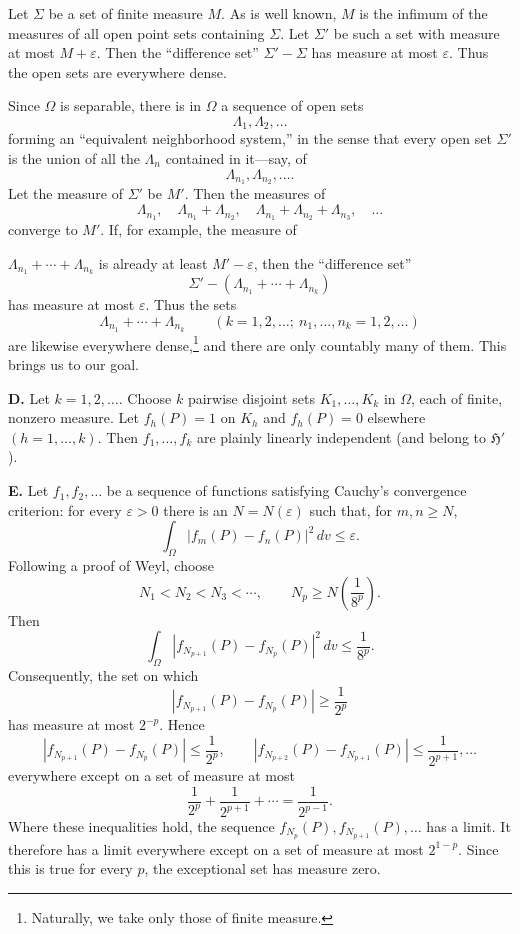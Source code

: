 ﻿\documentclass[paper=b5,fontsize=13pt,bookmarkpackage=false,twoside]{scrartcl}
\begin{document}
Let $\Sigma$ be a set of finite measure $M$. As is well known, $M$ is the infimum of the measures of all open point sets containing $\Sigma$. Let $\Sigma'$ be such a set with measure at most $M+\varepsilon$. Then the ``difference set'' $\Sigma'-\Sigma$ has measure at most $\varepsilon$. Thus the open sets are everywhere dense.

Since $\Omega$ is separable, there is in $\Omega$ a sequence of open sets
\[
\Lambda_1,\Lambda_2,\ldots
\]
forming an ``equivalent neighborhood system,'' in the sense that every open set $\Sigma'$ is the union of all the $\Lambda_n$ contained in it---say, of
\[
\Lambda_{n_1},\Lambda_{n_2},\ldots.
\]
Let the measure of $\Sigma'$ be $M'$. Then the measures of
\[
\Lambda_{n_1},\quad
\Lambda_{n_1}+\Lambda_{n_2},\quad
\Lambda_{n_1}+\Lambda_{n_2}+\Lambda_{n_3},\quad\ldots
\]
converge to $M'$. If, for example, the measure of

\(\Lambda_{n_1}+\cdots+\Lambda_{n_k}\) is already at least
\(M'-\varepsilon\), then the ``difference set''
\[
  \Sigma'-(\Lambda_{n_1}+\cdots+\Lambda_{n_k})
\]
has measure at most \(\varepsilon\).  Thus the sets
\[
  \Lambda_{n_1}+\cdots+\Lambda_{n_k}
  \qquad
  (k=1,2,\ldots;\ n_1,\ldots,n_k=1,2,\ldots)
\]
are likewise everywhere dense,\footnote{\label{fn:63}Naturally, we take only those
of finite measure.} and there are only countably many of them.  This
brings us to our goal.

\medskip
\noindent
\textbf{D.} Let \(k=1,2,\ldots\).  Choose \(k\) pairwise disjoint sets
\(K_1,\ldots,K_k\) in \(\Omega\), each of finite, nonzero measure.  Let
\(f_h(P)=1\) on \(K_h\) and \(f_h(P)=0\) elsewhere
\((h=1,\ldots,k)\).  Then \(f_1,\ldots,f_k\) are plainly linearly
independent (and belong to \(\mathfrak H'\)).

\medskip
\noindent
\textbf{E.} Let \(f_1,f_2,\ldots\) be a sequence of functions satisfying
Cauchy's convergence criterion: for every \(\varepsilon>0\) there is an
\(N=N(\varepsilon)\) such that, for \(m,n\geq N\),
\[
  \int_\Omega |f_m(P)-f_n(P)|^2\,dv\leq\varepsilon .
\]
Following a proof of Weyl, choose
\[
  N_1<N_2<N_3<\cdots,
  \qquad
  N_p\geq N\!\left(\frac1{8^p}\right).
\]
Then
\[
  \int_\Omega
  |f_{N_{p+1}}(P)-f_{N_p}(P)|^2\,dv\leq\frac1{8^p}.
\]
Consequently, the set on which
\[
  |f_{N_{p+1}}(P)-f_{N_p}(P)|\geq\frac1{2^p}
\]
has measure at most \(2^{-p}\).  Hence
\[
  |f_{N_{p+1}}(P)-f_{N_p}(P)|\leq\frac1{2^p},\qquad
  |f_{N_{p+2}}(P)-f_{N_{p+1}}(P)|\leq\frac1{2^{p+1}},\ldots
\]
everywhere except on a set of measure at most
\[
  \frac1{2^p}+\frac1{2^{p+1}}+\cdots=\frac1{2^{p-1}}.
\]
Where these inequalities hold, the sequence
\(f_{N_p}(P),f_{N_{p+1}}(P),\ldots\) has a limit.  It therefore has a
limit everywhere except on a set of measure at most \(2^{1-p}\).
Since this is true for every \(p\), the exceptional set has measure
zero.
\end{document}
